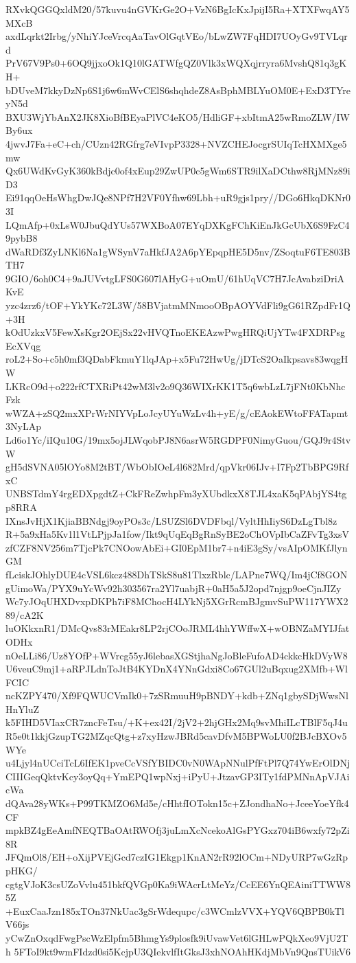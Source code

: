 RXvkQGGQxldM20/57kuvu4nGVKrGe2O+VzN6BgIcKxJpijI5Ra+XTXFwqAY5MXcB
axdLqrkt2Irbg/yNhiYJceVrcqAaTavOlGqtVEo/bLwZW7FqHDI7UOyGv9TVLqrd
PrV67V9Ps0+6OQ9jjxoOk1Q10lGATWfgQZ0Vlk3xWQXqjrryra6MvshQ81q3gKH+
bDUveM7kkyDzNp6S1j6w6mWvCElS6shqhdeZ8AsBphMBLYuOM0E+ExD3TYreyN5d
BXU3WjYbAnX2JK8XioBfBEyaPlVC4eKO5/HdliGF+xbItmA25wRmoZLW/IWBy6ux
4jwvJ7Fa+eC+ch/CUzn42RGfrg7eVIvpP3328+NVZCHEJocgrSUIqTcHXMXge5mw
Qx6UWdKvGyK360kBdjc0of4xEup29ZwUP0c5gWm6STR9ilXaDCthw8RjMNz89iD3
Ei91qqOeHsWhgDwJQe8NPf7H2VF0Yfhw69Lbh+uR9gjs1pry//DGo6HkqDKNr03I
LQmAfp+0xLsW0JbuQdYUs57WXBoA07EYqDXKgFChKiEnJkGcUbX6S9FzC49pybB8
dWaRDf3ZyLNKl6Na1gWSynV7aHkfJA2A6pYEpqpHE5D5nv/ZSoqtuF6TE803BTH7
9GIO/6oh0C4+9aJUVvtgLFS0G607lAHyG+uOmU/61hUqVC7H7JcAvabziDriAKvE
yzc4zrz6/tOF+YkYKc72L3W/58BVjatmMNmooOBpAOYVdFli9gG61RZpdFr1Q+3H
kOdUzkxV5FewXsKgr2OEjSx22vHVQTnoEKEAzwPwgHRQiUjYTw4FXDRPsgEcXVqg
roL2+So+c5h0mf3QDabFkmuY1lqJAp+x5Fu72HwUg/jDTcS2OaIkpsavs83wqgHW
LKRcO9d+o222rfCTXRiPt42wM3lv2o9Q36WIXrKK1T5q6wbLzL7jFNt0KbNhcFzk
wWZA+zSQ2mxXPrWrNIYVpLoJcyUYuWzLv4h+yE/g/cEAokEWtoFFATapmt3NyLAp
Ld6o1Yc/iIQu10G/19mx5ojJLWqobPJ8N6asrW5RGDPF0NimyGuou/GQJ9r4StvW
gH5dSVNA05lOYo8M2tBT/WbObIOeL4l682Mrd/qpVkr06IJv+I7Fp2TbBPG9RfxC
UNBSTdmY4rgEDXpgdtZ+CkFReZwhpFm3yXUbdkxX8TJL4xaK5qPAbjYS4tgp8RRA
IXnsJvHjX1KjiaBBNdgj9oyPOs3c/LSUZSl6DVDFbql/VyltHhIiyS6DzLgTbl8z
R+5a9xHa5Kv1l1VtLPjpJa1fow/Ikt9qUqEqBgRnSyBE2oChOVpIbCaZFvTg3xsV
zfCZF8NV256m7TjcPk7CNOowAbEi+GI0EpM1br7+n4iE3gSy/vsAIpOMKfJlynGM
fLciskJOhlyDUE4cVSL6kcz488DhTSkS8u81TlxzRblc/LAPne7WQ/Im4jCf8GON
gUimoWa/PYX9uYcWv92h303567ra2Yl7uabjR+0aH5a5J2opd7njgp9oeCjnJIZy
Wc7yJOqUHXDvxpDKPh7iF8MChocH4LYkNj5XGrRcmBJgmvSuPW117YWX289/cA2K
luOKkxnR1/DMcQvs83rMEakr8LP2rjCOoJRML4hhYWffwX+wOBNZaMYIJfatODHx
nOeLLi86/Uz8YOfP+WVrcg55yJ6lebasXGStjhaNgJoBleFufoAD4ckkcHkDVyW8
U6veuC9mj1+aRPJLdnToJtB4KYDnX4YNnGdxi8Co67GUl2uBqxug2XMfb+WlFCIC
ncKZPY470/Xf9FQWUCVmIk0+7zSRmuuH9pBNDY+kdb+ZNq1gbySDjWwsNlHnYluZ
k5FIHD5VIaxCR7zncFeTsu/+K+ex42I/2jV2+2hjGHx2Mq9svMhiILcTBlF5qJ4u
R5e0t1kkjGzupTG2MZqcQtg+z7xyHzwJBRd5cavDfvM5BPWoLU0f2BJcBXOv5WYe
u4Ljyl4nUCciTcL6IfEK1pveCcVSfYBIDC0vN0WApNNulPfFtPl7Q74YwErOlDNj
CIIIGeqQktvKcy3oyQq+YmEPQ1wpNxj+iPyU+JtzavGP3ITy1fdPMNnApVJAicWa
dQAva28yWKs+P99TKMZO6Md5e/cHhtfIOTokn15c+ZJondhaNo+JceeYoeYfk4CF
mpkBZ4gEeAmfNEQTBaOAtRWOfj3juLmXcNcekoAlGsPYGxz704iB6wxfy72pZi8R
JFQmOl8/EH+oXijPVEjGcd7czIG1Ekgp1KnAN2rR92lOCm+NDyURP7wGzRppHKG/
cgtgVJoK3csUZoVvlu451bkfQVGp0Ka9iWAcrLtMeYz/CcEE6YnQEAiniTTWW85Z
+EuxCaaJzn185xTOn37NkUac3gSrWdequpc/c3WCmlzVVX+YQV6QBPB0kTlV66js
yCwZnOxqdFwgPscWzElpfm5BhmgYs9plosfk9iUvawVet6lGHLwPQkXeo9VjU2Th
5FToI9kt9wmFIdzd0si5KcjpU3QIekvlfItGksJ3xhNOAhHKdjMbVn9QnsTUikV6
